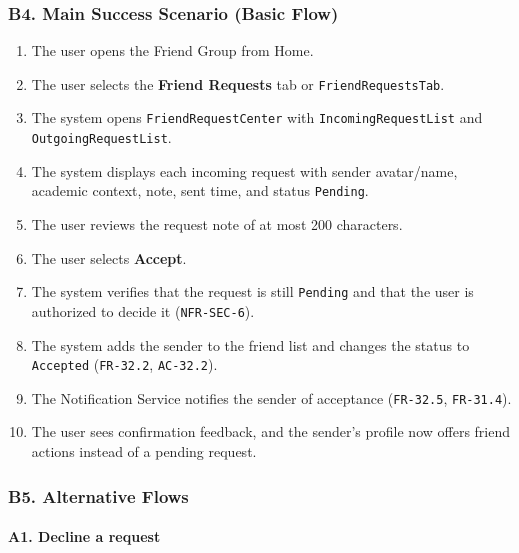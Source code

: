 \documentclass[12pt]{article}
\begin{document}
\hypertarget{sec:b4-main-success-scenario-basic-flow}{}
\subsubsection*{B4. Main Success Scenario (Basic Flow)}
\par\medskip

\begin{enumerate}
\item The user opens the Friend Group from Home.
\item The user selects the \textbf{Friend Requests} tab or \texttt{FriendRequestsTab}.
\item The system opens \texttt{FriendRequestCenter} with \texttt{IncomingRequestList} and \texttt{OutgoingRequestList}.
\item The system displays each incoming request with sender avatar/name, academic context, note, sent time, and status \texttt{Pending}.
\item The user reviews the request note of at most 200 characters.
\item The user selects \textbf{Accept}.
\item The system verifies that the request is still \texttt{Pending} and that the user is authorized to decide it (\texttt{NFR-SEC-6}).
\item The system adds the sender to the friend list and changes the status to \texttt{Accepted} (\texttt{FR-32.2}, \texttt{AC-32.2}).
\item The Notification Service notifies the sender of acceptance (\texttt{FR-32.5}, \texttt{FR-31.4}).
\item The user sees confirmation feedback, and the sender's profile now offers friend actions instead of a pending request.
\end{enumerate}
\par\medskip

\hypertarget{sec:b5-alternative-flows}{}
\subsubsection*{B5. Alternative Flows}
\par\medskip

\hypertarget{sec:a1-decline-a-request}{}
\paragraph*{A1. Decline a request}
\par\medskip
\end{document}

